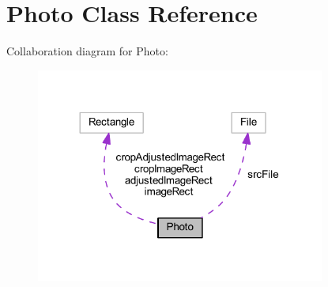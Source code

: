 \hypertarget{class_photo}{\section{Photo Class Reference}
\label{class_photo}
}


Collaboration diagram for Photo\-:
\nopagebreak
\begin{figure}[H]
\begin{center}
\leavevmode
\includegraphics[width=269pt]{class_photo__coll__graph}
\end{center}
\end{figure}
